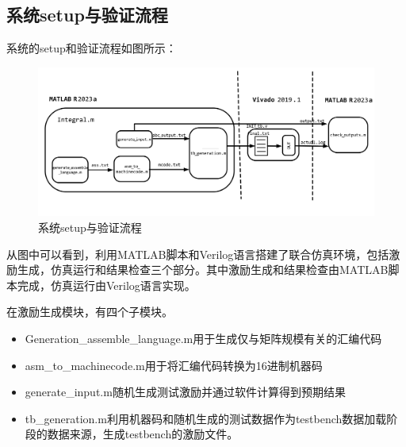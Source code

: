 \documentclass{article}
\begin{document}
\subsection{系统setup与验证流程}

系统的setup和验证流程如图所示：
\begin{figure}
    \centering
    \includegraphics[width = \textwidth]{Flow.png}
    \caption{系统setup与验证流程}
\end{figure}
\newpage
从图中可以看到，利用MATLAB脚本和Verilog语言搭建了联合仿真环境，包括激励生成，仿真运行和结果检查三个部分。其中激励生成和结果检查由MATLAB脚本完成，仿真运行由Verilog语言实现。

在激励生成模块，有四个子模块。
\begin{itemize}
\item Generation\_assemble\_language.m用于生成仅与矩阵规模有关的汇编代码
\item asm\_to\_machinecode.m用于将汇编代码转换为16进制机器码
\item generate\_input.m随机生成测试激励并通过软件计算得到预期结果
\item tb\_generation.m利用机器码和随机生成的测试数据作为testbench数据加载阶段的数据来源，生成testbench的激励文件。
\end{itemize}
\end{document}
